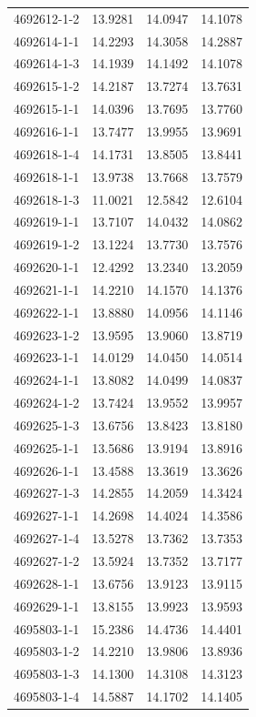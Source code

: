 \begin{longtable}{lrrr}
4692612-1-2 & 13.9281 & 14.0947 & 14.1078 \\
4692614-1-1 & 14.2293 & 14.3058 & 14.2887 \\
4692614-1-3 & 14.1939 & 14.1492 & 14.1078 \\
4692615-1-2 & 14.2187 & 13.7274 & 13.7631 \\
4692615-1-1 & 14.0396 & 13.7695 & 13.7760 \\
4692616-1-1 & 13.7477 & 13.9955 & 13.9691 \\
4692618-1-4 & 14.1731 & 13.8505 & 13.8441 \\
4692618-1-1 & 13.9738 & 13.7668 & 13.7579 \\
4692618-1-3 & 11.0021 & 12.5842 & 12.6104 \\
4692619-1-1 & 13.7107 & 14.0432 & 14.0862 \\
4692619-1-2 & 13.1224 & 13.7730 & 13.7576 \\
4692620-1-1 & 12.4292 & 13.2340 & 13.2059 \\
4692621-1-1 & 14.2210 & 14.1570 & 14.1376 \\
4692622-1-1 & 13.8880 & 14.0956 & 14.1146 \\
4692623-1-2 & 13.9595 & 13.9060 & 13.8719 \\
4692623-1-1 & 14.0129 & 14.0450 & 14.0514 \\
4692624-1-1 & 13.8082 & 14.0499 & 14.0837 \\
4692624-1-2 & 13.7424 & 13.9552 & 13.9957 \\
4692625-1-3 & 13.6756 & 13.8423 & 13.8180 \\
4692625-1-1 & 13.5686 & 13.9194 & 13.8916 \\
4692626-1-1 & 13.4588 & 13.3619 & 13.3626 \\
4692627-1-3 & 14.2855 & 14.2059 & 14.3424 \\
4692627-1-1 & 14.2698 & 14.4024 & 14.3586 \\
4692627-1-4 & 13.5278 & 13.7362 & 13.7353 \\
4692627-1-2 & 13.5924 & 13.7352 & 13.7177 \\
4692628-1-1 & 13.6756 & 13.9123 & 13.9115 \\
4692629-1-1 & 13.8155 & 13.9923 & 13.9593 \\
4695803-1-1 & 15.2386 & 14.4736 & 14.4401 \\
4695803-1-2 & 14.2210 & 13.9806 & 13.8936 \\
4695803-1-3 & 14.1300 & 14.3108 & 14.3123 \\
4695803-1-4 & 14.5887 & 14.1702 & 14.1405 \\

\end{longtable}
